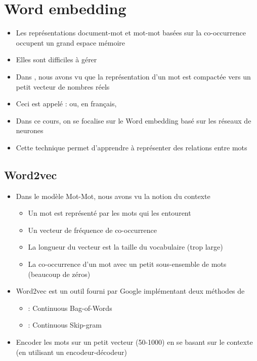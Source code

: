 \documentclass{KodeBook}
\begin{document}
\section{Word embedding}

\begin{itemize}
	\item Les représentations document-mot et mot-mot basées sur la co-occurrence occupent un grand espace mémoire 
	\item Elles sont difficiles à gérer 
	\item Dans , nous avons vu que la représentation d'un mot est compactée vers un petit vecteur de nombres réels
	\item Ceci est appelé :  ou, en français, 
	\item Dans ce cours, on se focalise sur le Word embedding basé sur les réseaux de neurones
	\item Cette technique permet d'apprendre à représenter des relations entre mots
\end{itemize}

\subsection{Word2vec}

\begin{itemize}
	\item Dans le modèle Mot-Mot, nous avons vu la notion du contexte 
	\begin{itemize}
		\item Un mot est représenté par les mots qui les entourent
		\item Un vecteur de fréquence de co-occurrence
		\item La longueur du vecteur est la taille du vocabulaire (trop large)
		\item La co-occurrence d'un mot avec un petit sous-ensemble de mots (beaucoup de zéros)
	\end{itemize}
	\item Word2vec est un outil fourni par Google implémentant deux méthodes de  \cite{2013-mikolov-al}
	\begin{itemize}
		\item {} : Continuous Bag-of-Words
		\item {} : Continuous Skip-gram
	\end{itemize}
	\item Encoder les mots sur un petit vecteur (50-1000) en se basant sur le contexte (en utilisant un encodeur-décodeur)
\end{itemize}
\end{document}
